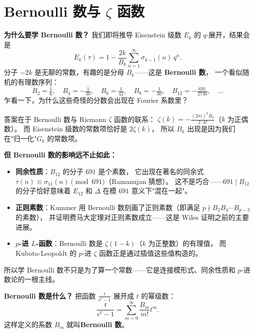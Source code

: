 \section{Bernoulli 数与 $\zeta$ 函数}
\label{sec:bernoulli}

\textbf{为什么要学 Bernoulli 数？}
我们即将推导 Eisenstein 级数 $E_k$ 的 $q$-展开，结果会是
\[
  E_k(\tau) = 1 - \frac{2k}{B_k} \sum_{n=1}^{\infty} \sigma_{k-1}(n)\, q^n.
\]
分子 $-2k$ 是无聊的常数，有趣的是分母 $B_k$——这是 \textbf{Bernoulli 数}，
一个看似随机的有理数序列：
\[
  B_2 = \tfrac{1}{6},\quad B_4 = -\tfrac{1}{30},\quad B_6 = \tfrac{1}{42},\quad
  B_8 = -\tfrac{1}{30},\quad B_{12} = -\tfrac{691}{2730}, \quad \ldots
\]
乍看一下，为什么这些奇怪的分数会出现在 Fourier 系数里？

答案在于 Bernoulli 数与 Riemann $\zeta$ 函数的联系：
$\zeta(k) = -\frac{(2\pi i)^k B_k}{2 \cdot k!}$（$k$ 为正偶数）。
而 Eisenstein 级数的常数项恰好是 $2\zeta(k)$，
所以 $B_k$ 出现是因为我们在"归一化"$G_k$ 的常数项。

\textbf{但 Bernoulli 数的影响远不止如此：}
\begin{itemize}
  \item \textbf{同余性质}：$B_{12}$ 的分子 $691$ 是个素数，
    它出现在著名的同余式 $\tau(n) \equiv \sigma_{11}(n) \pmod{691}$（Ramanujan 猜想）。
    这不是巧合——$691 \mid B_{12}$ 的分子恰好意味着 $E_{12}$ 和 $\Delta$ 在模 $691$ 意义下"混在一起"。
  \item \textbf{正则素数}：Kummer 用 Bernoulli 数刻画了正则素数（即满足 $p \nmid B_2 B_4 \cdots B_{p-3}$ 的素数），
    并证明费马大定理对正则素数成立——这是 Wiles 证明之前的主要进展。
  \item \textbf{$p$-进 $L$-函数}：Bernoulli 数是 $\zeta(1-k)$（$k$ 为正整数）的有理值，
    而 Kubota-Leopoldt 的 $p$-进 $\zeta$ 函数正是通过插值这些值构造的。
\end{itemize}
所以学 Bernoulli 数不只是为了算一个常数——它是连接模形式、同余性质和 $p$-进数论的一根主线。

\textbf{Bernoulli 数是什么？}
把函数 $\frac{t}{e^t - 1}$ 展开成 $t$ 的幂级数：
\[
  \frac{t}{e^t - 1} = \sum_{m=0}^{\infty} \frac{B_m}{m!} t^m.
\]
这样定义的系数 $B_m$ 就叫\textbf{Bernoulli 数}。

